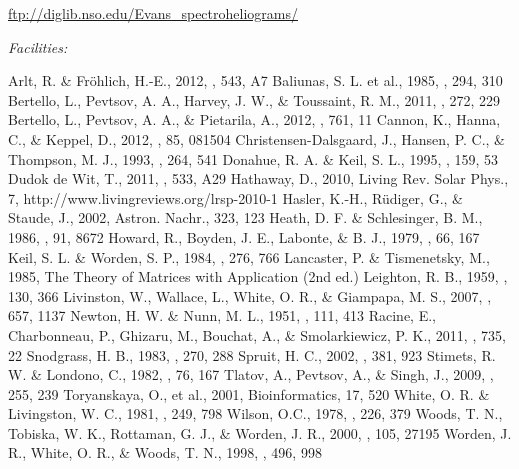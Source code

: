 \documentclass[preprint2]{aastex}
\begin{document}
\noindent
\url{ftp://diglib.nso.edu/Evans_spectroheliograms/} 

{\it Facilities:} 

\begin{thebibliography}{}\setlength{\itemsep}{-2mm}
\footnotesize
{} Arlt, R. \& Fr\"{o}hlich, H.-E., 2012, \aap, 543, A7
 Baliunas, S. L. et al., 1985, \apj, 294, 310
 Bertello, L., Pevtsov, A. A., Harvey, J. W., \& Toussaint, R. M., 2011, \solphys , 272, 229
 Bertello, L., Pevtsov, A. A., \& Pietarila, A., 2012, \apj, 761, 11
 Cannon, K., Hanna, C., \& Keppel, D., 2012, \prd, 85, 081504
 Christensen-Dalsgaard, J., Hansen, P. C., \& Thompson, M. J., 1993, \mnras, 264, 541
 Donahue, R. A. \& Keil, S. L., 1995, \solphys, 159, 53
 Dudok de Wit, T.,  2011, \aap, 533, A29
 Hathaway, D., 2010, Living Rev. Solar Phys., 7, http://www.livingreviews.org/lrsp-2010-1
 Hasler, K.-H., R\"{u}diger, G., \& Staude, J., 2002, Astron. Nachr., 323, 123
 Heath, D. F. \& Schlesinger, B. M., 1986, \jgr, 91, 8672
 Howard, R., Boyden, J. E., Labonte, \&  B. J., 1979, \solphys, 66, 167
 Keil, S. L. \& Worden, S. P., 1984, \apj, 276, 766
 Lancaster, P. \& Tismenetsky, M., 1985, The Theory of Matrices with Application (2nd ed.)
 Leighton, R. B., 1959, \apj, 130, 366 
 Livinston, W., Wallace, L., White, O. R., \& Giampapa, M. S., 2007, \apj, 657, 1137
 Newton, H. W. \& Nunn, M. L., 1951, \mnras, 111, 413
 Racine, E., Charbonneau, P., Ghizaru, M., Bouchat, A., \& Smolarkiewicz, P. K., 2011, \apj, 735, 22
 Snodgrass, H. B., 1983, \apj, 270, 288
 Spruit, H. C., 2002, \aap, 381, 923
 Stimets, R. W. \& Londono, C., 1982, \solphys, 76, 167
 Tlatov, A., Pevtsov, A., \& Singh, J., 2009, \solphys, 255, 239
 Toryanskaya, O., et al., 2001, Bioinformatics, 17, 520
 White, O. R. \& Livingston, W. C., 1981, \apj, 249, 798
 Wilson, O.C., 1978, \apj, 226, 379
 Woods, T. N., Tobiska, W. K., Rottaman, G. J., \& Worden, J. R., 2000, \jgr, 105, 27195
 Worden, J. R., White, O. R., \& Woods, T. N., 1998, \apj, 496, 998
\normalsize
\end{thebibliography}
\end{document}
